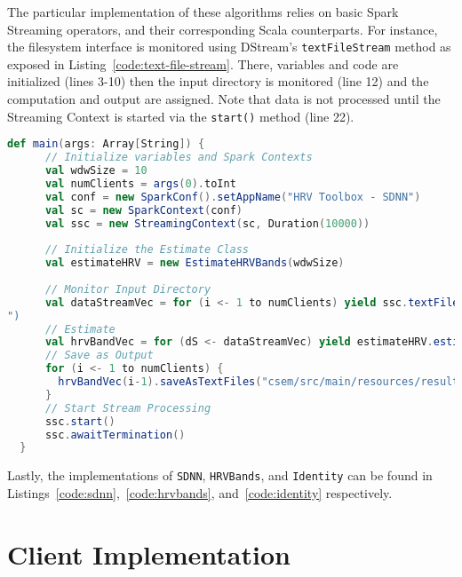 The particular implementation of these algorithms relies on basic Spark Streaming operators, and their corresponding Scala counterparts.
For instance, the filesystem interface is monitored using DStream's \texttt{textFileStream} method as exposed in Listing~\ref{code:text-file-stream}. There, variables and code are initialized (lines 3-10) then the input directory is monitored (line 12) and the computation and output are assigned. Note that data is not processed until the Streaming Context is started via the \texttt{start()} method (line 22).
\begin{lstlisting}[language=Scala,caption={Snippet illustrating \texttt{textFileStream} functionality.},label=code:text-file-stream]
def main(args: Array[String]) {
      // Initialize variables and Spark Contexts
      val wdwSize = 10
      val numClients = args(0).toInt
      val conf = new SparkConf().setAppName("HRV Toolbox - SDNN")          
      val sc = new SparkContext(conf)                                    
      val ssc = new StreamingContext(sc, Duration(10000))                 
                                                                          
      // Initialize the Estimate Class
      val estimateHRV = new EstimateHRVBands(wdwSize)
      
      // Monitor Input Directory                           
      val dataStreamVec = for (i <- 1 to numClients) yield ssc.textFileStream("csem/src/main/resources/csv/"+i.toString+"/
")                                                                                                                     
      // Estimate
      val hrvBandVec = for (dS <- dataStreamVec) yield estimateHRV.estimate(dS)
      // Save as Output
      for (i <- 1 to numClients) {
        hrvBandVec(i-1).saveAsTextFiles("csem/src/main/resources/results/" + i.toString + "/sdnn")
      }
      // Start Stream Processing
      ssc.start()
      ssc.awaitTermination()
  }
\end{lstlisting}
Lastly, the implementations of \texttt{SDNN}, \texttt{HRVBands}, and \texttt{Identity} can be found in Listings~\ref{code:sdnn},~\ref{code:hrvbands}, and~\ref{code:identity} respectively.

\section{Client Implementation} \label{sec:client-implementation}

